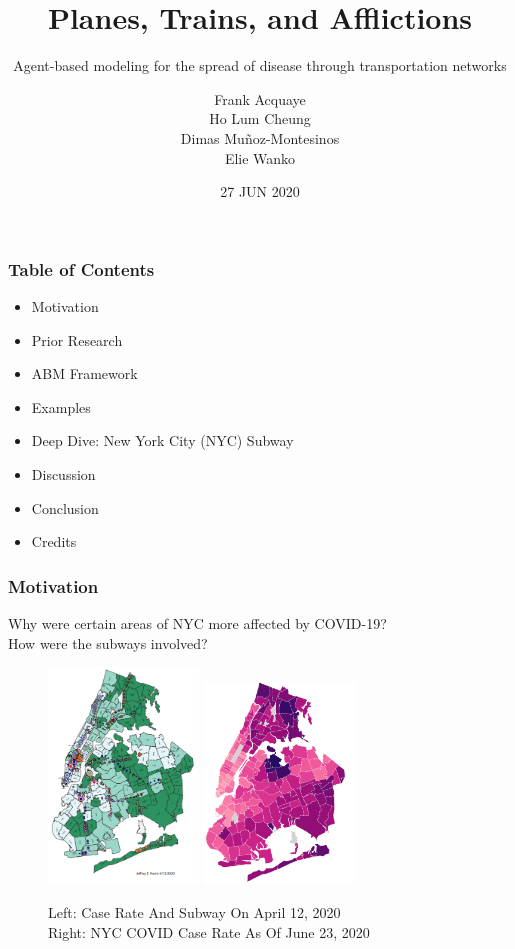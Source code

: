 \documentclass{beamer}
\begin{document}
\title{Planes, Trains, and Afflictions}
\subtitle{Agent-based modeling for the spread of disease through transportation networks}
\author[NS Group 3]{Frank Acquaye\\
Ho Lum Cheung\\
Dimas Muñoz-Montesinos\\
Elie Wanko}
\date{27 JUN 2020}
\begin{frame}
\titlepage
\end{frame}
\begin{frame}
\frametitle{Table of Contents}
\begin{itemize}
    \item Motivation
    \item Prior Research
    \item ABM Framework
    \item Examples
    \item Deep Dive: New York City (NYC) Subway
    \item Discussion
    \item Conclusion
    \item Credits
\end{itemize}
\end{frame}
\begin{frame}
\frametitle{Motivation}
Why were certain areas of NYC more affected by COVID-19?\\
How were the subways involved?\\
\begin{figure}
\includegraphics[width=4cm]{Scratch_Visuals/NYC_COVID_Subways_Jeff.png}%
\includegraphics[width=4cm]{Scratch_Visuals/NYC_COVID_Case_Rate.png}
\caption{
Left: Case Rate And Subway On April 12, 2020 \cite{subway_epidemic_seed}\\
Right: NYC COVID Case Rate As Of June 23, 2020 \cite{nyc_health_covid_summary}
}
\end{figure}
\end{frame}
\end{document}
